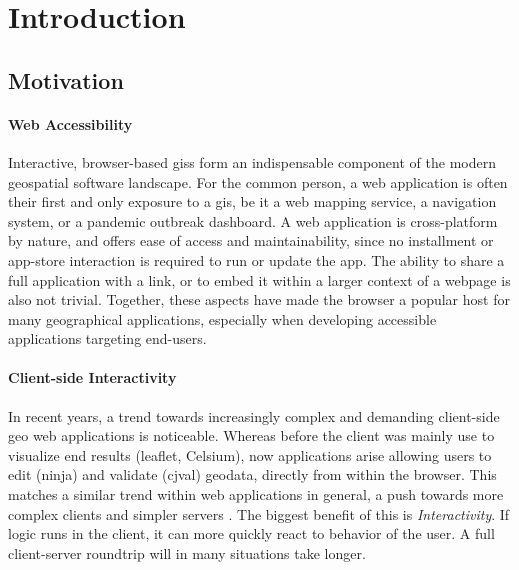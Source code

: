 \chapter{Introduction}

\section{Motivation}


\subsubsection*{ Web Accessibility }
Interactive, browser-based \ac{giss} form an indispensable component of the modern geospatial software landscape. 
For the common person, a web application is often their first and only exposure to a \acs{gis}, be it a web mapping service, a navigation system, or a pandemic outbreak dashboard. 
A web application is cross-platform by nature, and offers ease of access and  maintainability, since no installment or app-store interaction is required to run or update the app. 
The ability to share a full application with a link, or to embed it within a larger context of a webpage is also not trivial. 
Together, these aspects have made the browser a popular host for many geographical applications, especially when developing accessible applications targeting end-users. 

\subsubsection*{Client-side Interactivity}
In recent years, a trend towards increasingly complex and demanding client-side geo web applications is noticeable.  
Whereas before the client was mainly use to visualize end results (leaflet, Celsium), now applications arise allowing users to edit (ninja) and validate (cjval) geodata, directly from within the browser. 
This matches a similar trend within web applications in general, a push towards more complex clients and simpler servers \cite{panidi_hybrid_2015}.
The biggest benefit of this is \emph{Interactivity}. If logic runs in the client, it can more quickly react to behavior of the user. A full client-server roundtrip will in many situations take longer.


